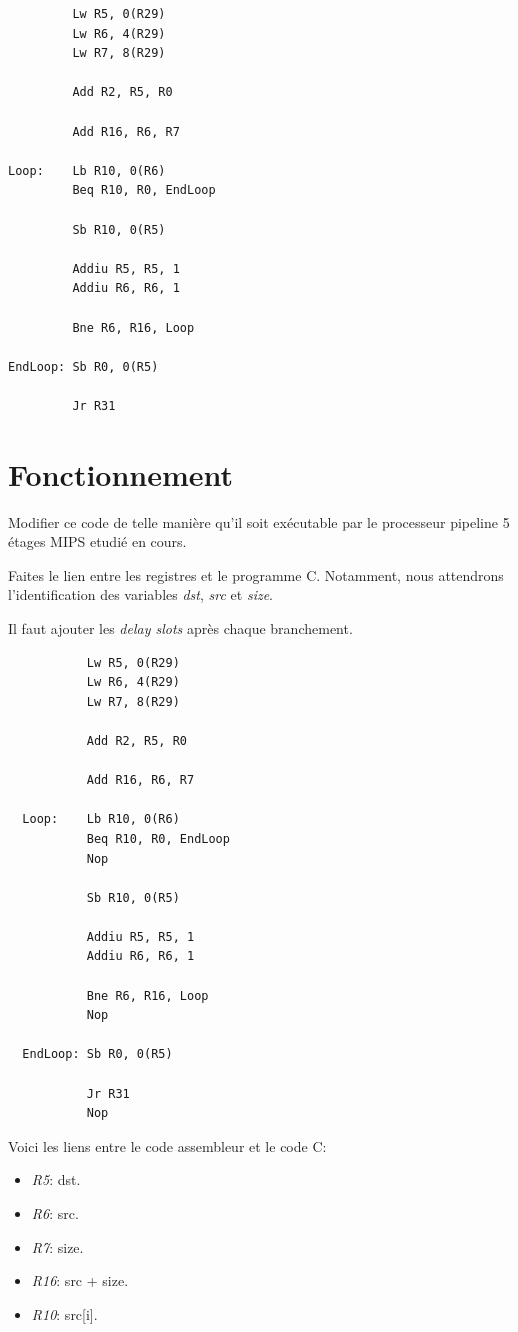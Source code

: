 \begin{verbatim}
         Lw R5, 0(R29)
         Lw R6, 4(R29)
         Lw R7, 8(R29)

         Add R2, R5, R0

         Add R16, R6, R7

Loop:    Lb R10, 0(R6)
         Beq R10, R0, EndLoop

         Sb R10, 0(R5)

         Addiu R5, R5, 1
         Addiu R6, R6, 1

         Bne R6, R16, Loop

EndLoop: Sb R0, 0(R5)

         Jr R31
\end{verbatim}

%
%

\section{Fonctionnement}

Modifier ce code de telle mani\`ere qu'il soit ex\'ecutable par le processeur
pipeline 5 \'etages MIPS etudi\'e en cours.

Faites le lien entre les registres et le programme C. Notamment,
nous attendrons l'identification des variables \textit{dst}, \textit{src}
et \textit{size}.

\begin{correction}

  Il faut ajouter les \textit{delay slots} apr\`es chaque branchement.

  \begin{verbatim}
           Lw R5, 0(R29)
           Lw R6, 4(R29)
           Lw R7, 8(R29)

           Add R2, R5, R0

           Add R16, R6, R7

  Loop:    Lb R10, 0(R6)
           Beq R10, R0, EndLoop
           Nop

           Sb R10, 0(R5)

           Addiu R5, R5, 1
           Addiu R6, R6, 1

           Bne R6, R16, Loop
           Nop

  EndLoop: Sb R0, 0(R5)

           Jr R31
           Nop
  \end{verbatim}

  Voici les liens entre le code assembleur et le code C:

  \begin{itemize}
    \item
      \textit{R5}: dst.
    \item
      \textit{R6}: src.
    \item
      \textit{R7}: size.
    \item
      \textit{R16}: src + size.
    \item
      \textit{R10}: src[i].
  \end{itemize}

\end{correction}

